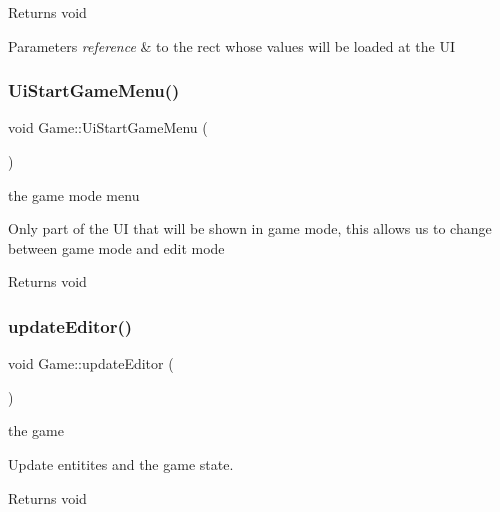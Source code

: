 \begin{DoxyReturn}{Returns}
void 
\end{DoxyReturn}

\begin{DoxyParams}{Parameters}
{\em reference} & to the rect whose values will be loaded at the UI \\
\hline
\end{DoxyParams}
\mbox{\label{class_game_aa18ae3db4c6d5b2fac2080afcd8e6790}} 
\subsubsection{\texorpdfstring{Ui\+Start\+Game\+Menu()}{UiStartGameMenu()}}
{\footnotesize\ttfamily void Game\+::\+Ui\+Start\+Game\+Menu (\begin{DoxyParamCaption}{ }\end{DoxyParamCaption})}

the game mode menu

Only part of the UI that will be shown in game mode, this allows us to change between game mode and edit mode

\begin{DoxyReturn}{Returns}
void 
\end{DoxyReturn}
\mbox{\label{class_game_a81abd2f677aba0c3f068c902d690e2fb}} 
\subsubsection{\texorpdfstring{update\+Editor()}{updateEditor()}}
{\footnotesize\ttfamily void Game\+::update\+Editor (\begin{DoxyParamCaption}{ }\end{DoxyParamCaption})}

the game

Update entitites and the game state.

\begin{DoxyReturn}{Returns}
void 
\end{DoxyReturn}
\mbox{\label{class_game_a67a8c5c0356c9ad33fac1abc435a3746}} 
